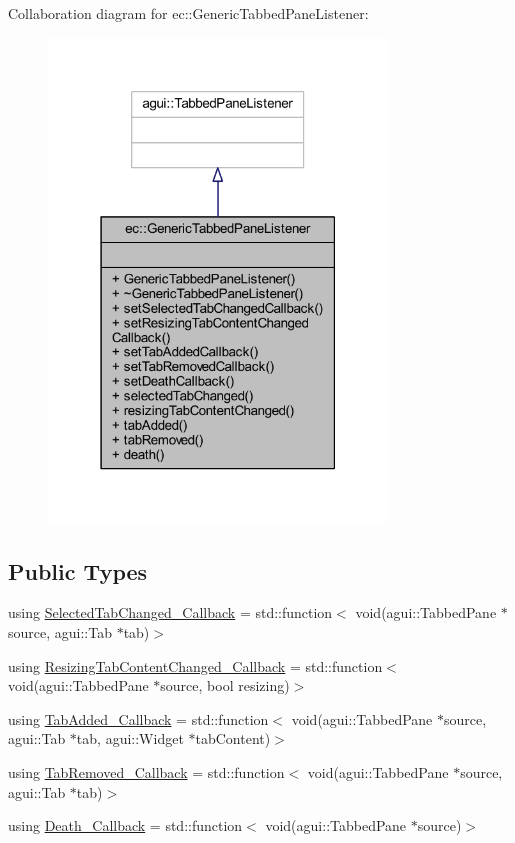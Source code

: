 Collaboration diagram for ec\+:\+:Generic\+Tabbed\+Pane\+Listener\+:\nopagebreak
\begin{figure}[H]
\begin{center}
\leavevmode
\includegraphics[width=255pt]{classec_1_1_generic_tabbed_pane_listener__coll__graph}
\end{center}
\end{figure}
\subsection*{Public Types}
\begin{DoxyCompactItemize}
\item 
using \mbox{\hyperlink{classec_1_1_generic_tabbed_pane_listener_adbb9c0a73499ce6b26ba1c8569cb8525}{Selected\+Tab\+Changed\+\_\+\+Callback}} = std\+::function$<$ void(agui\+::\+Tabbed\+Pane $\ast$source, agui\+::\+Tab $\ast$tab)$>$
\item 
using \mbox{\hyperlink{classec_1_1_generic_tabbed_pane_listener_a41097f0918f8888f9e970e9c9a5f0d52}{Resizing\+Tab\+Content\+Changed\+\_\+\+Callback}} = std\+::function$<$ void(agui\+::\+Tabbed\+Pane $\ast$source, bool resizing)$>$
\item 
using \mbox{\hyperlink{classec_1_1_generic_tabbed_pane_listener_aef726cc6897d8994602cb127693e664d}{Tab\+Added\+\_\+\+Callback}} = std\+::function$<$ void(agui\+::\+Tabbed\+Pane $\ast$source, agui\+::\+Tab $\ast$tab, agui\+::\+Widget $\ast$tab\+Content)$>$
\item 
using \mbox{\hyperlink{classec_1_1_generic_tabbed_pane_listener_a806d9a110845a5bdcb4b10e7fb57beca}{Tab\+Removed\+\_\+\+Callback}} = std\+::function$<$ void(agui\+::\+Tabbed\+Pane $\ast$source, agui\+::\+Tab $\ast$tab)$>$
\item 
using \mbox{\hyperlink{classec_1_1_generic_tabbed_pane_listener_a158699bc84b6a145e3dafec53ab63061}{Death\+\_\+\+Callback}} = std\+::function$<$ void(agui\+::\+Tabbed\+Pane $\ast$source)$>$
\end{DoxyCompactItemize}
